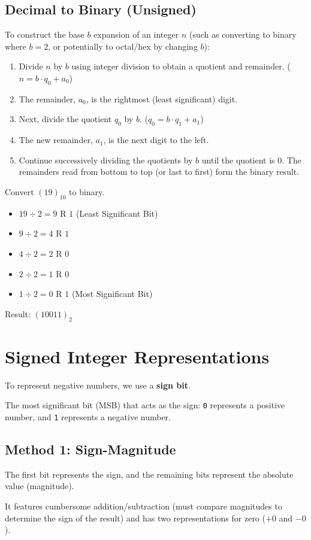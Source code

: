 \subsection{Decimal to Binary (Unsigned)}
To construct the base $b$ expansion of an integer $n$ (such as converting to binary where $b=2$, or potentially to octal/hex by changing $b$):
\begin{enumerate}
    \item Divide $n$ by $b$ using integer division to obtain a quotient and remainder. ($n = b \cdot q_0 + a_0$)
    \item The remainder, $a_0$, is the rightmost (least significant) digit.
    \item Next, divide the quotient $q_0$ by $b$. ($q_0 = b \cdot q_1 + a_1$)
    \item The new remainder, $a_1$, is the next digit to the left.
    \item Continue successively dividing the quotients by $b$ until the quotient is 0. The remainders read from bottom to top (or last to first) form the binary result.
\end{enumerate}

\begin{example}
Convert $(19)_{10}$ to binary.
\begin{itemize}
    \item $19 \div 2 = 9$ R $1$ (Least Significant Bit)
    \item $9 \div 2 = 4$ R $1$
    \item $4 \div 2 = 2$ R $0$
    \item $2 \div 2 = 1$ R $0$
    \item $1 \div 2 = 0$ R $1$ (Most Significant Bit)
\end{itemize}
Result: $(10011)_2$
\end{example}

\section{Signed Integer Representations}

To represent negative numbers, we use a \textbf{sign bit}.

\begin{vocabulary}
The most significant bit (MSB) that acts as the sign: \texttt{0} represents a positive number, and \texttt{1} represents a negative number.
\end{vocabulary}

\subsection{Method 1: Sign-Magnitude}
The first bit represents the sign, and the remaining bits represent the absolute value (magnitude).
\begin{remark}
It features cumbersome addition/subtraction (must compare magnitudes to determine the sign of the result) and has two representations for zero ($+0$ and $-0$).
\end{remark}

